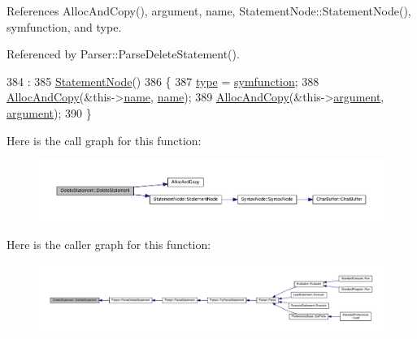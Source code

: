 References Alloc\+And\+Copy(), argument, name, Statement\+Node\+::\+Statement\+Node(), symfunction, and type.



Referenced by Parser\+::\+Parse\+Delete\+Statement().


\begin{DoxyCode}
384                                                                        :
385     \hyperlink{classStatementNode_a586026d6009a39d087792d621de86360}{StatementNode}()
386 \{
387     \hyperlink{classDeleteStatement_a46629e67cd652c61ccabfc79c4cc8e01}{type} = \hyperlink{lex_8h_a7feef761cd73fac6e25b8bb80d2c4e54ac0ac9c237f5df41937de351d33daeef4}{symfunction};
388     \hyperlink{clib_8h_a5bed05c70cb17e541fee570b5dc32e1a}{AllocAndCopy}(&this->\hyperlink{classDeleteStatement_aec9706bae02a354afec8f639e283e5b9}{name}, \hyperlink{classDeleteStatement_aec9706bae02a354afec8f639e283e5b9}{name});
389     \hyperlink{clib_8h_a5bed05c70cb17e541fee570b5dc32e1a}{AllocAndCopy}(&this->\hyperlink{classDeleteStatement_a0fe7f24dcfd05e0f7f449e19aaabee2d}{argument}, \hyperlink{classDeleteStatement_a0fe7f24dcfd05e0f7f449e19aaabee2d}{argument});
390 \}
\end{DoxyCode}


Here is the call graph for this function\+:\nopagebreak
\begin{figure}[H]
\begin{center}
\leavevmode
\includegraphics[width=350pt]{classDeleteStatement_ae742b66f6a74b0420e8ee54c8bc4a980_cgraph}
\end{center}
\end{figure}




Here is the caller graph for this function\+:\nopagebreak
\begin{figure}[H]
\begin{center}
\leavevmode
\includegraphics[width=350pt]{classDeleteStatement_ae742b66f6a74b0420e8ee54c8bc4a980_icgraph}
\end{center}
\end{figure}


